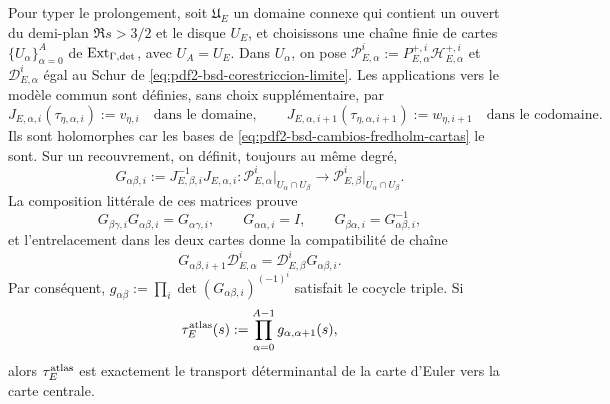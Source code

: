 Pour typer le prolongement, soit $\mathfrak U_E$ un domaine connexe qui contient
un ouvert du demi-plan $\Re s>3/2$ et le disque $U_E$, et choisissons une chaîne
finie de cartes $\{U_\alpha\}_{\alpha=0}^A$ de
$\operatorname{Ext}_{\Gamma,{\rm det}}$, avec $U_A=U_E$. Dans $U_\alpha$, on
pose
$\mathscr P_{E,\alpha}^i:=
P_{E,\alpha}^{+,i}\mathscr H_{E,\alpha}^{+,i}$ et
$\mathscr D_{E,\alpha}^i$ égal au Schur de
\eqref{eq:pdf2-bsd-corestriccion-limite}. Les applications vers le modèle commun sont
définies, sans choix supplémentaire, par
\begin{equation}\label{eq:pdf2-bsd-j-cartas-modelo-comun}
 J_{E,\alpha,i}(\tau_{\eta,\alpha,i}):=v_{\eta,i}
 \quad\text{dans le domaine},
 \qquad
 J_{E,\alpha,i+1}(\tau_{\eta,\alpha,i+1}):=w_{\eta,i+1}
 \quad\text{dans le codomaine}.
\end{equation}
Ils sont holomorphes car les bases de
\eqref{eq:pdf2-bsd-cambios-fredholm-cartas} le sont. Sur un recouvrement, on
définit, toujours au même degré,
\begin{equation}\label{eq:pdf2-bsd-transiciones-atlas}
 G_{\alpha\beta,i}:=J_{E,\beta,i}^{-1}J_{E,\alpha,i}:
 \mathscr P_{E,\alpha}^i\big|_{U_\alpha\cap U_\beta}
 \longrightarrow
 \mathscr P_{E,\beta}^i\big|_{U_\alpha\cap U_\beta}.
\end{equation}
La composition littérale de ces matrices prouve
\begin{equation}\label{eq:pdf2-bsd-cociclo-atlas}
 G_{\beta\gamma,i}G_{\alpha\beta,i}=G_{\alpha\gamma,i},
 \qquad G_{\alpha\alpha,i}=I,
 \qquad G_{\beta\alpha,i}=G_{\alpha\beta,i}^{-1},
\end{equation}
et l'entrelacement dans les deux cartes donne la compatibilité de chaîne
\begin{equation}\label{eq:pdf2-bsd-cociclo-cadena}
 G_{\alpha\beta,i+1}\mathscr D_{E,\alpha}^i
 =\mathscr D_{E,\beta}^iG_{\alpha\beta,i}.
\end{equation}
Par conséquent,
$g_{\alpha\beta}:=\prod_i\det(G_{\alpha\beta,i})^{(-1)^i}$ satisfait le
cocycle triple. Si
\begin{equation}\label{eq:pdf2-bsd-tau-atlas}
 \tau_E^{\rm atlas}(s):=
 \prod_{\alpha=0}^{A-1}g_{\alpha,\alpha+1}(s),
\end{equation}
alors $\tau_E^{\rm atlas}$ est exactement le transport déterminantal
de la carte d'Euler vers la carte centrale.

